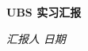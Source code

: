 \begin{center}
  \LARGE \bf UBS 实习汇报
\end{center}

\begin{center}
  \emph{汇报人} \underline{\makebox[7em][c]{\name}}
  \emph{日期} \underline{\makebox[12em][c]{\mydate}}
\end{center}


